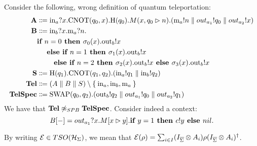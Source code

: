 \begin{example}
	Consider the following, wrong definition of quantum teleportation:
	\begin{align*}
		\text{\textbf{A}} &\Coloneqq \text{in}_a?x.\text{CNOT}(q_0, x).\text{H}(q_0).M(x,q_0 \rhd n).(\text{m}_a!n \parallel out_{a_1}! q_0 \parallel out_{a_2}! x )\\
    \text{\textbf{B}} &\Coloneqq \text{in}_b?x.\text{m}_a?n.
       \\ & \textbf{if } n = 0 \textbf{ then } \sigma_0(x).\text{out}_b!x\\&\quad \textbf{ else } \textbf{if } n = 1 \textbf{ then } \sigma_1(x).\text{out}_b!x\\&\qquad \textbf{ else } \textbf{if } n = 2 \textbf{ then } \sigma_2(x).\text{out}_b!x \textbf{ else } \sigma_3(x).\text{out}_b!x
      \\
		\text{\textbf{S}} &\Coloneqq \text{H}(q_1).\text{CNOT}(q_1, q_2).(\text{in}_a!q_1 \parallel \text{in}_b!q_2) \\
		\text{\textbf{Tel}} &\Coloneqq (A \parallel B \parallel S) \setminus \Set{\text{in}_a, \text{in}_b, \text{m}_a } \\
		\text{\textbf{TelSpec}} &\Coloneqq \text{SWAP}(q_0,q_2).(\text{out}_b!q_2 \parallel out_{a_1}! q_0 \parallel out_{a_2}! q_1)
	\end{align*}
	We have that $\text{\textbf{Tel}} \not\approx_{SPB} \text{\textbf{TelSpec}}$.
	Consider indeed a context:
  \[ B[{-}] = out_{a_1} ? x . M[x \rhd y] . \textbf{if } y = 1 \textbf{ then } c!y \textbf{ else } nil. \]
\end{example}



By writing $\mathcal{E} \in TSO(\mathcal{H}_{\Sigma})$, we mean that $\mathcal{E}(\rho) = \sum_{i \in I} (I_{\overline{\Sigma}} \otimes A_i) \rho (I_{\overline{\Sigma}} \otimes A_i)^{\dagger}$.

